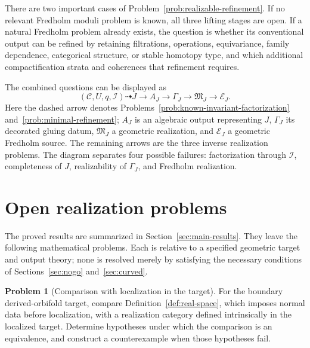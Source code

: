 \documentclass[11pt,letterpaper,twoside]{article}
\theoremstyle{plain}
\theoremstyle{definition}
\newtheorem{problem}[theorem]{Problem}
\theoremstyle{remark}
\begin{document}
There are two important cases of Problem~\ref{prob:realizable-refinement}.  If no relevant Fredholm moduli problem is known, all three lifting stages are open.  If a natural Fredholm problem already exists, the question is whether its conventional output can be refined by retaining filtrations, operations, equivariance, family dependence, categorical structure, or stable homotopy type, and which additional compactification strata and coherences that refinement requires.

The combined questions can be displayed as
\begin{equation}\label{eq:question-driven-chain}
 \boxed{
 (\mathcal C,U,q,\mathcal I)
 \dashrightarrow J
 \longrightarrow A_J
 \longrightarrow \Gamma_J
 \longrightarrow \mathfrak M_J
 \longrightarrow \mathcal E_J.}
\end{equation}
Here the dashed arrow denotes Problems~\ref{prob:known-invariant-factorization} and~\ref{prob:minimal-refinement}; \(A_J\) is an algebraic output representing \(J\), \(\Gamma_J\) its decorated gluing datum, \(\mathfrak M_J\) a geometric realization, and \(\mathcal E_J\) a geometric Fredholm source.  The remaining arrows are the three inverse realization problems.  The diagram separates four possible failures: factorization through \(\mathcal I\), completeness of \(J\), realizability of \(\Gamma_J\), and Fredholm realization.

\section{Open realization problems}\label{sec:agenda}

The proved results are summarized in Section~\ref{sec:main-results}.  They leave the following mathematical problems.  Each is relative to a specified geometric target and output theory; none is resolved merely by satisfying the necessary conditions of Sections~\ref{sec:nogo} and~\ref{sec:curved}.

\begin{problem}[Comparison with localization in the target]\label{prob:target-localization-comparison}
For the boundary derived-orbifold target, compare Definition~\ref{def:real-space}, which imposes normal data before localization, with a realization category defined intrinsically in the localized target.  Determine hypotheses under which the comparison is an equivalence, and construct a counterexample when those hypotheses fail.
\end{problem}
\end{document}

